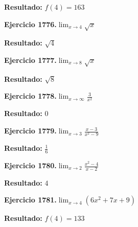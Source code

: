 \documentclass[10pt,a4paper]{article}
\begin{document}
\begin{solbox}
\textbf{Resultado:} \(\displaystyle f(4) = 163\)
\end{solbox}

\begin{ejbox}
\textbf{Ejercicio 1776.}\quad $\lim_{x\to 4} \sqrt{x}$
\end{ejbox}

\begin{solbox}
\textbf{Resultado:} \(\displaystyle \sqrt{4}\)
\end{solbox}

\newpage
\begin{ejbox}
\textbf{Ejercicio 1777.}\quad $\lim_{x\to 8} \sqrt{x}$
\end{ejbox}

\begin{solbox}
\textbf{Resultado:} \(\displaystyle \sqrt{8}\)
\end{solbox}

\begin{ejbox}
\textbf{Ejercicio 1778.}\quad $\lim_{x\to \infty} \frac{3}{x^2}$
\end{ejbox}

\begin{solbox}
\textbf{Resultado:} \(\displaystyle 0\)
\end{solbox}

\begin{ejbox}
\textbf{Ejercicio 1779.}\quad $\lim_{x\to 3} \frac{x-3}{x^2-9}$
\end{ejbox}

\begin{solbox}
\textbf{Resultado:} \(\displaystyle \frac{1}{6}\)
\end{solbox}

\newpage
\begin{ejbox}
\textbf{Ejercicio 1780.}\quad $\lim_{x\to 2} \frac{x^2-4}{x-2}$
\end{ejbox}

\begin{solbox}
\textbf{Resultado:} \(\displaystyle 4\)
\end{solbox}

\begin{ejbox}
\textbf{Ejercicio 1781.}\quad $\lim_{x\to 4} (6x^2 +7x +9)$
\end{ejbox}

\begin{solbox}
\textbf{Resultado:} \(\displaystyle f(4) = 133\)
\end{solbox}
\end{document}
